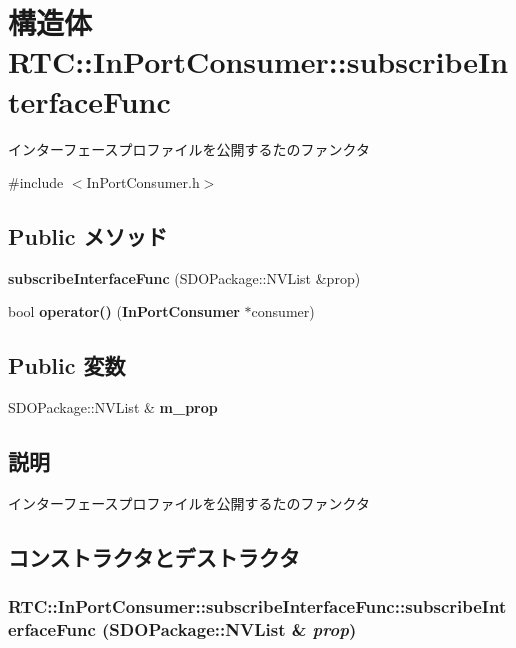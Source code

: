 \section{構造体 RTC::InPortConsumer::subscribeInterfaceFunc}
\label{structRTC_1_1InPortConsumer_1_1subscribeInterfaceFunc}


インターフェースプロファイルを公開するたのファンクタ  




{\ttfamily \#include $<$InPortConsumer.h$>$}

\subsection*{Public メソッド}
\begin{DoxyCompactItemize}
\item 
{\bf subscribeInterfaceFunc} (SDOPackage::NVList \&prop)
\item 
bool {\bf operator()} ({\bf InPortConsumer} $\ast$consumer)
\end{DoxyCompactItemize}
\subsection*{Public 変数}
\begin{DoxyCompactItemize}
\item 
SDOPackage::NVList \& {\bf m\_\-prop}
\end{DoxyCompactItemize}


\subsection{説明}
インターフェースプロファイルを公開するたのファンクタ 

\subsection{コンストラクタとデストラクタ}
\subsubsection[{subscribeInterfaceFunc}]{\setlength{\rightskip}{0pt plus 5cm}RTC::InPortConsumer::subscribeInterfaceFunc::subscribeInterfaceFunc (SDOPackage::NVList \& {\em prop})\hspace{0.3cm}{\ttfamily  [inline]}}\label{structRTC_1_1InPortConsumer_1_1subscribeInterfaceFunc_ab1bca317275a1d23844ce5bae9c23521}


